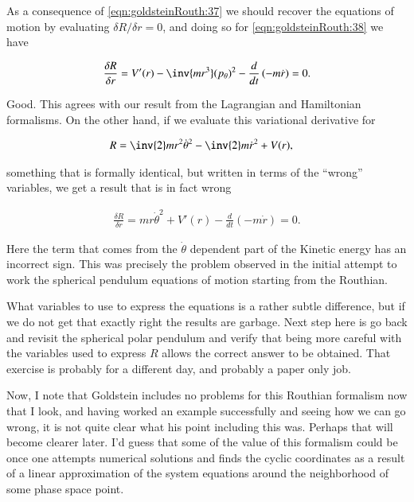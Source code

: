 As a consequence of \ref{eqn:goldsteinRouth:37} we should recover the equations of motion by evaluating $\delta R/\delta r = 0$, and doing so for \ref{eqn:goldsteinRouth:38} we have

\begin{align}\label{eqn:goldsteinRouth:39}
\frac{\delta R}{\delta r} = V'(r) - \inv{m r^3} (p_\theta)^2 - \frac{d}{dt}\left( -m \dot{r} \right) = 0.
\end{align}

Good.  This agrees with our result from the Lagrangian and Hamiltonian formalisms.  On the other hand, if we evaluate this variational derivative for 

\begin{align}\label{eqn:goldsteinRouth:40}
R &= \inv{2} m r^2 \dot{\theta}^2 - \inv{2} m \dot{r}^2 + V(r),
\end{align}

something that is formally identical, but written in terms of the ``wrong'' variables, we get a result that is in fact wrong

\begin{align}\label{eqn:goldsteinRouth:39}
\frac{\delta R}{\delta r} = m r \dot{\theta}^2 + V'(r) - \frac{d}{dt}\left( -m \dot{r} \right) = 0.
\end{align}

Here the term that comes from the $\dot{\theta}$ dependent part of the Kinetic energy has an incorrect sign.  This was precisely the problem observed in the initial attempt to work the spherical pendulum equations of motion starting from the Routhian.

What variables to use to express the equations is a rather subtle difference, but if we do not get that exactly right the results are garbage.  Next step here is go back and revisit the spherical polar pendulum and verify that being more careful with the variables used to express $R$ allows the correct answer to be obtained.  That exercise is probably for a different day, and probably a paper only job.

Now, I note that Goldstein includes no problems for this Routhian formalism now that I look, and having worked an example successfully and seeing how we can go wrong, it is not quite clear what his point including this was.  Perhaps that will become clearer later.  I'd guess that some of the value of this formalism could be once one attempts numerical solutions and finds the cyclic coordinates as a result of a linear approximation of the system equations around the neighborhood of some phase space point.

\EndArticle

